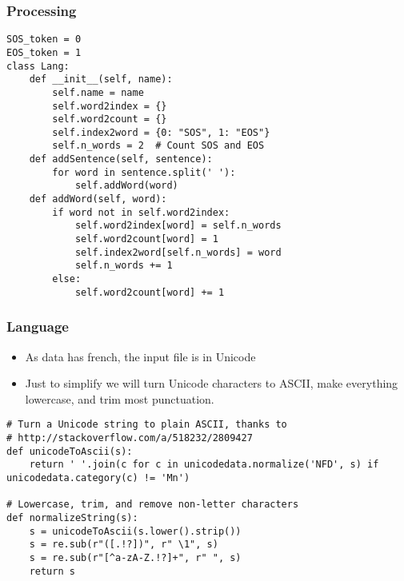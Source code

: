\begin{frame}[fragile]
\frametitle{Processing}
\begin{lstlisting}    
SOS_token = 0
EOS_token = 1
class Lang:
    def __init__(self, name):
        self.name = name
        self.word2index = {}
        self.word2count = {}
        self.index2word = {0: "SOS", 1: "EOS"}
        self.n_words = 2  # Count SOS and EOS
    def addSentence(self, sentence):
        for word in sentence.split(' '):
            self.addWord(word)
    def addWord(self, word):
        if word not in self.word2index:
            self.word2index[word] = self.n_words
            self.word2count[word] = 1
            self.index2word[self.n_words] = word
            self.n_words += 1
        else:
            self.word2count[word] += 1
\end{lstlisting}   
   
\end{frame} 

\begin{frame}[fragile]
\frametitle{ Language}
\begin{itemize}
\item As data has french, the input file is in Unicode
\item Just to simplify we will turn Unicode characters to ASCII, make everything lowercase, and trim most punctuation.
\end{itemize}
\begin{lstlisting}    
# Turn a Unicode string to plain ASCII, thanks to
# http://stackoverflow.com/a/518232/2809427
def unicodeToAscii(s):
    return ' '.join(c for c in unicodedata.normalize('NFD', s) if unicodedata.category(c) != 'Mn')

# Lowercase, trim, and remove non-letter characters
def normalizeString(s):
    s = unicodeToAscii(s.lower().strip())
    s = re.sub(r"([.!?])", r" \1", s)
    s = re.sub(r"[^a-zA-Z.!?]+", r" ", s)
    return s
\end{lstlisting}         
\end{frame} 


